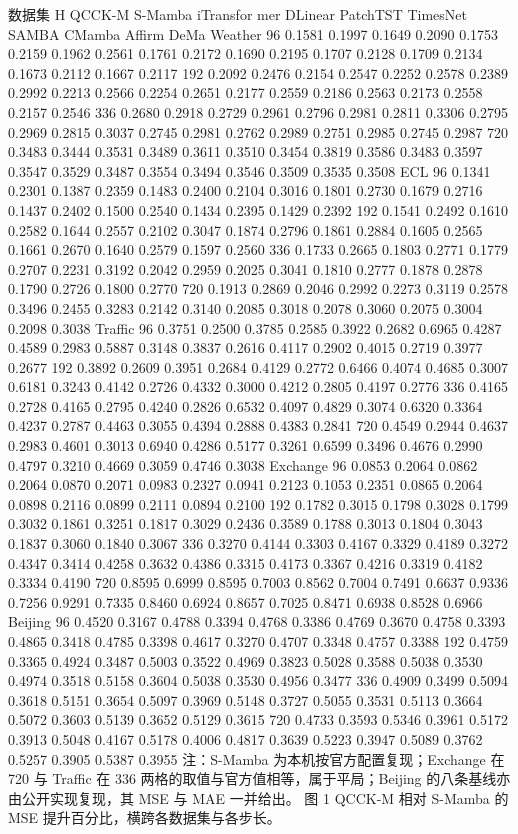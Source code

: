 \documentclass[
]{article}
\begin{document}
数据集 H QCCK-M S-Mamba iTransfor mer DLinear PatchTST TimesNet SAMBA
CMamba Affirm DeMa Weather 96 0.1581 0.1997 0.1649 0.2090 0.1753 0.2159
0.1962 0.2561 0.1761 0.2172 0.1690 0.2195 0.1707 0.2128 0.1709 0.2134
0.1673 0.2112 0.1667 0.2117 192 0.2092 0.2476 0.2154 0.2547 0.2252
0.2578 0.2389 0.2992 0.2213 0.2566 0.2254 0.2651 0.2177 0.2559 0.2186
0.2563 0.2173 0.2558 0.2157 0.2546 336 0.2680 0.2918 0.2729 0.2961
0.2796 0.2981 0.2811 0.3306 0.2795 0.2969 0.2815 0.3037 0.2745 0.2981
0.2762 0.2989 0.2751 0.2985 0.2745 0.2987 720 0.3483 0.3444 0.3531
0.3489 0.3611 0.3510 0.3454 0.3819 0.3586 0.3483 0.3597 0.3547 0.3529
0.3487 0.3554 0.3494 0.3546 0.3509 0.3535 0.3508 ECL 96 0.1341 0.2301
0.1387 0.2359 0.1483 0.2400 0.2104 0.3016 0.1801 0.2730 0.1679 0.2716
0.1437 0.2402 0.1500 0.2540 0.1434 0.2395 0.1429 0.2392 192 0.1541
0.2492 0.1610 0.2582 0.1644 0.2557 0.2102 0.3047 0.1874 0.2796 0.1861
0.2884 0.1605 0.2565 0.1661 0.2670 0.1640 0.2579 0.1597 0.2560 336
0.1733 0.2665 0.1803 0.2771 0.1779 0.2707 0.2231 0.3192 0.2042 0.2959
0.2025 0.3041 0.1810 0.2777 0.1878 0.2878 0.1790 0.2726 0.1800 0.2770
720 0.1913 0.2869 0.2046 0.2992 0.2273 0.3119 0.2578 0.3496 0.2455
0.3283 0.2142 0.3140 0.2085 0.3018 0.2078 0.3060 0.2075 0.3004 0.2098
0.3038 Traffic 96 0.3751 0.2500 0.3785 0.2585 0.3922 0.2682 0.6965
0.4287 0.4589 0.2983 0.5887 0.3148 0.3837 0.2616 0.4117 0.2902 0.4015
0.2719 0.3977 0.2677 192 0.3892 0.2609 0.3951 0.2684 0.4129 0.2772
0.6466 0.4074 0.4685 0.3007 0.6181 0.3243 0.4142 0.2726 0.4332 0.3000
0.4212 0.2805 0.4197 0.2776 336 0.4165 0.2728 0.4165 0.2795 0.4240
0.2826 0.6532 0.4097 0.4829 0.3074 0.6320 0.3364 0.4237 0.2787 0.4463
0.3055 0.4394 0.2888 0.4383 0.2841 720 0.4549 0.2944 0.4637 0.2983
0.4601 0.3013 0.6940 0.4286 0.5177 0.3261 0.6599 0.3496 0.4676 0.2990
0.4797 0.3210 0.4669 0.3059 0.4746 0.3038 Exchange 96 0.0853 0.2064
0.0862 0.2064 0.0870 0.2071 0.0983 0.2327 0.0941 0.2123 0.1053 0.2351
0.0865 0.2064 0.0898 0.2116 0.0899 0.2111 0.0894 0.2100 192 0.1782
0.3015 0.1798 0.3028 0.1799 0.3032 0.1861 0.3251 0.1817 0.3029 0.2436
0.3589 0.1788 0.3013 0.1804 0.3043 0.1837 0.3060 0.1840 0.3067 336
0.3270 0.4144 0.3303 0.4167 0.3329 0.4189 0.3272 0.4347 0.3414 0.4258
0.3632 0.4386 0.3315 0.4173 0.3367 0.4216 0.3319 0.4182 0.3334 0.4190
720 0.8595 0.6999 0.8595 0.7003 0.8562 0.7004 0.7491 0.6637 0.9336
0.7256 0.9291 0.7335 0.8460 0.6924 0.8657 0.7025 0.8471 0.6938 0.8528
0.6966 Beijing 96 0.4520 0.3167 0.4788 0.3394 0.4768 0.3386 0.4769
0.3670 0.4758 0.3393 0.4865 0.3418 0.4785 0.3398 0.4617 0.3270 0.4707
0.3348 0.4757 0.3388 192 0.4759 0.3365 0.4924 0.3487 0.5003 0.3522
0.4969 0.3823 0.5028 0.3588 0.5038 0.3530 0.4974 0.3518 0.5158 0.3604
0.5038 0.3530 0.4956 0.3477 336 0.4909 0.3499 0.5094 0.3618 0.5151
0.3654 0.5097 0.3969 0.5148 0.3727 0.5055 0.3531 0.5113 0.3664 0.5072
0.3603 0.5139 0.3652 0.5129 0.3615 720 0.4733 0.3593 0.5346 0.3961
0.5172 0.3913 0.5048 0.4167 0.5178 0.4006 0.4817 0.3639 0.5223 0.3947
0.5089 0.3762 0.5257 0.3905 0.5387 0.3955 注：S-Mamba
为本机按官方配置复现；Exchange 在 720 与 Traffic 在 336
两格的取值与官方值相等，属于平局；Beijing 的八条基线亦由公开实现复现，其
MSE 与 MAE 一并给出。 图 1 QCCK-M 相对 S-Mamba 的 MSE
提升百分比，横跨各数据集与各步长。
\end{document}
